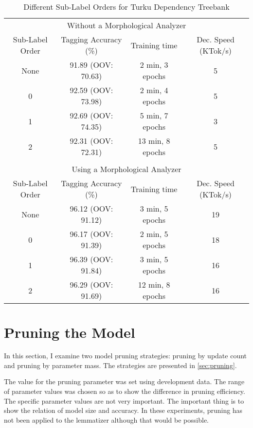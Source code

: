 \begin{table}[htb!]
\begin{center}
\begin{tabular}{cccc}
\multicolumn{4}{c}{Without a Morphological Analyzer}\\
Sub-Label Order & Tagging Accuracy (\%) & Training time    & Dec. Speed (KTok/s)\\
\hline
None            & 91.89 (OOV: 70.63)    & 2 min, 3 epochs  & 5                       \\
0               &  92.59 (OOV: 73.98)   & 2 min, 4 epochs  & 5                       \\
1               &  92.69 (OOV: 74.35)   & 5 min, 7 epochs  & 3                       \\
2               &  92.31 (OOV: 72.31)   & 13 min, 8 epochs  & 5                       \\
                &                       &                  &                          \\
\multicolumn{4}{c}{Using a Morphological Analyzer}\\
Sub-Label Order & Tagging Accuracy (\%) & Training time    & Dec. Speed (KTok/s)\\
\hline
None            &  96.12 (OOV: 91.12)   & 3 min, 5 epochs  & 19                       \\
0               &  96.17 (OOV: 91.39)   & 2 min, 5 epochs  & 18                       \\
1               &  96.39 (OOV: 91.84)   & 3 min, 5 epochs  & 16                       \\
2               &  96.29 (OOV: 91.69)   & 12 min, 8 epochs  & 16                       \\
\end{tabular}
\caption{Different Sub-Label Orders for Turku Dependency Treebank}
\end{center}
\end{table}


\section{Pruning the Model}

In this section, I examine two model pruning strategies: pruning by
update count and pruning by parameter mass. The strategies are
presented in \ref{sec:pruning}.

The value for the pruning parameter was set using development
data. The range of parameter values was chosen so as to show the
difference in pruning efficiency. The specific parameter values are
not very important. The important thing is to show the relation of
model size and accuracy. In these experiments, pruning has not been
applied to the lemmatizer although that would be possible.

